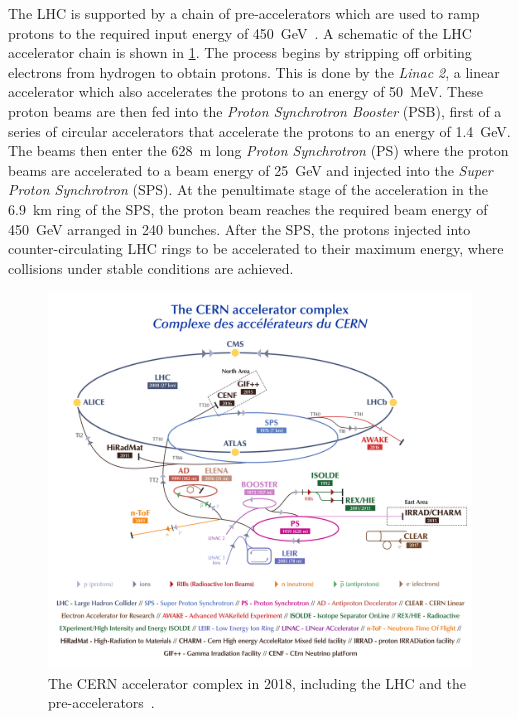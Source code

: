 The LHC is supported by a chain of pre-accelerators which are used to ramp protons to the required input energy of \SI{450}{\giga\eV}~\cite{LHCInjectorChain,LHCFacts}. A schematic of the LHC accelerator chain is shown in \cref{fig:method:CERN-complex}. The process begins by stripping off orbiting electrons from hydrogen to obtain protons. This is done by the \emph{Linac 2}, a linear accelerator which also accelerates the protons to an energy of \SI{50}{\mega\eV}. These proton beams are then fed into the \emph{Proton Synchrotron Booster} (PSB), first of a series of circular accelerators that accelerate the protons to an energy of \SI{1.4}{\giga\eV}. The beams then enter the \SI{628}{\meter} long \emph{Proton Synchrotron} (PS) where the proton beams are accelerated to a beam energy of \SI{25}{\giga\eV} and injected into the \emph{Super Proton Synchrotron} (SPS). At the penultimate stage of the acceleration in the \SI{6.9}{\kilo\meter} ring of the SPS, the proton beam reaches the required beam energy of \SI{450}{\giga\eV} arranged in 240 bunches. After the SPS, the protons injected into counter-circulating LHC rings to be accelerated to their maximum energy, where collisions under stable conditions are achieved.
\begin{figure}
    \centering
    \includegraphics[width=\textwidth]{images/CCC-v2018-print-v2.pdf}
    \caption[The CERN accelerator complex]{The CERN accelerator complex in 2018, including the LHC and the pre-accelerators~\cite{CERNComplex}.}
    \label{fig:method:CERN-complex}
\end{figure}

